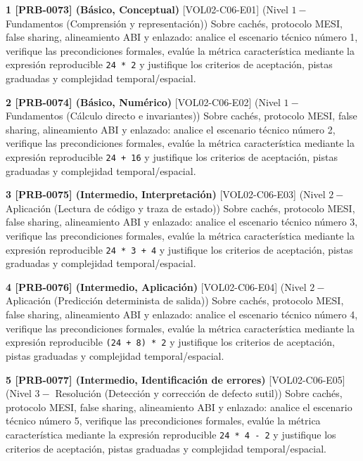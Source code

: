\documentclass{book}
\begin{document}
\begin{tcolorbox}[title={Ejercicios}, studiumworked, breakable]

\noindent\textbf{1 [PRB-0073] (Básico, Conceptual)}
[VOL02-C06-E01] (Nivel \(1 -\) Fundamentos (Comprensión y representación)) Sobre cachés, protocolo MESI, false sharing, alineamiento ABI y enlazado: analice el escenario técnico número 1, verifique las precondiciones formales, evalúe la métrica característica mediante la expresión reproducible \texttt{24 * 2} y justifique los criterios de aceptación, pistas graduadas y complejidad temporal/espacial.

\noindent\textbf{2 [PRB-0074] (Básico, Numérico)}
[VOL02-C06-E02] (Nivel \(1 -\) Fundamentos (Cálculo directo e invariantes)) Sobre cachés, protocolo MESI, false sharing, alineamiento ABI y enlazado: analice el escenario técnico número 2, verifique las precondiciones formales, evalúe la métrica característica mediante la expresión reproducible \texttt{24 + 16} y justifique los criterios de aceptación, pistas graduadas y complejidad temporal/espacial.

\noindent\textbf{3 [PRB-0075] (Intermedio, Interpretación)}
[VOL02-C06-E03] (Nivel \(2 -\) Aplicación (Lectura de código y traza de estado)) Sobre cachés, protocolo MESI, false sharing, alineamiento ABI y enlazado: analice el escenario técnico número 3, verifique las precondiciones formales, evalúe la métrica característica mediante la expresión reproducible \texttt{24 * 3 + 4} y justifique los criterios de aceptación, pistas graduadas y complejidad temporal/espacial.

\noindent\textbf{4 [PRB-0076] (Intermedio, Aplicación)}
[VOL02-C06-E04] (Nivel \(2 -\) Aplicación (Predicción determinista de salida)) Sobre cachés, protocolo MESI, false sharing, alineamiento ABI y enlazado: analice el escenario técnico número 4, verifique las precondiciones formales, evalúe la métrica característica mediante la expresión reproducible \texttt{(24 + 8) * 2} y justifique los criterios de aceptación, pistas graduadas y complejidad temporal/espacial.

\noindent\textbf{5 [PRB-0077] (Intermedio, Identificación de errores)}
[VOL02-C06-E05] (Nivel \(3 -\) Resolución (Detección y corrección de defecto sutil)) Sobre cachés, protocolo MESI, false sharing, alineamiento ABI y enlazado: analice el escenario técnico número 5, verifique las precondiciones formales, evalúe la métrica característica mediante la expresión reproducible \texttt{24 * 4 - 2} y justifique los criterios de aceptación, pistas graduadas y complejidad temporal/espacial.


\end{tcolorbox}
\end{document}
